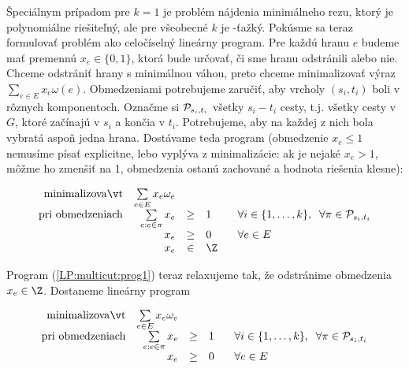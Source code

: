 \noindent
Špeciálnym prípadom pre $k=1$ je problém nájdenia minimálneho rezu, ktorý je polynomiálne riešiteľný,
ale pre všeobecné $k$ je \minmulticut \NP-ťažký. Pokúsme sa teraz formulovať problém \minmulticut
ako celočíselný lineárny program. Pre každú hranu $e$  budeme mať premennú $x_e\in\{0,1\}$, ktorá bude
určovať, či sme hranu odstránili alebo nie. Chceme odstrániť hrany s minimálnou váhou, preto
chceme minimalizovať výraz $\sum_{e\in E}x_e\omega(e)$. Obmedzeniami potrebujeme zaručiť, aby vrcholy 
$(s_i,t_i)$ boli v rôznych komponentoch. Označme si ${\cal P}_{s_i,t_i}$ všetky $s_i-t_i$ cesty, t.j. všetky cesty 
v $G$, ktoré začínajú v $s_i$ a končia v $t_i$. Potrebujeme, aby na každej z nich bola vybratá aspoň
jedna hrana. Dostávame teda program (obmedzenie $x_e\le 1$ nemusíme písať explicitne, lebo
vyplýva z minimalizácie: ak je nejaké $x_e>1$, môžme ho zmenšiť na 1, obmedzenia ostanú zachované a hodnota
riešenia klesne):


\begin{equation}
\label{LP:multicut:prog1}
\begin{array}{rrcll}
  {\rm minimalizovať}     & \multicolumn{1}{l}{ \sum\limits_{e\in E}x_e\omega_e}\\
  {\rm pri\ obmedzeniach} & \sum\limits_{e:e\in\pi}x_e&\ge&1& \;\;\;
                              \forall i\in\{1,\ldots,k\},\;\; \forall \pi\in {\cal P}_{s_i,t_i}\\
                          & x_e&\ge&0& \;\;\;\forall e\in E\\
                          & x_e&\in&\Z
\end{array}
\end{equation}


\noindent
Program (\ref{LP:multicut:prog1}) teraz relaxujeme tak, že odstránime obmedzenia $x_e\in\Z$. Dostaneme lineárny program

\begin{equation}
\label{LP:multicut:prog2}
\begin{array}{rrcll}
  {\rm minimalizovať}     & \multicolumn{1}{l}{ \sum\limits_{e\in E}x_e\omega_e}\\
  {\rm pri\ obmedzeniach} & \sum\limits_{e:e\in\pi}x_e&\ge&1& \;\;\;
                              \forall i\in\{1,\ldots,k\},\;\; \forall \pi\in {\cal P}_{s_i,t_i}\\
                          & x_e&\ge&0& \;\;\;\forall e\in E\\
\end{array}
\end{equation}

